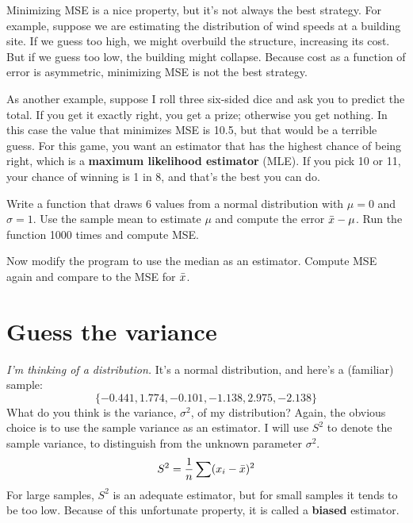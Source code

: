 \documentclass[12pt]{book}
\begin{document}
Minimizing MSE is a nice property, but it's not always the best
strategy.  For example, suppose we are estimating the distribution of
wind speeds at a building site.  If we guess too high, we might
overbuild the structure, increasing its cost.  But if we guess too
low, the building might collapse.  Because cost as a function of
error is asymmetric, minimizing MSE is not the best strategy.


As another example, suppose I roll three six-sided dice and ask you
to predict the total.  If you get it exactly right, you get a prize;
otherwise you get nothing.  In this case the value that minimizes MSE
is 10.5, but that would be a terrible guess.  For this game, you
want an estimator that has the highest chance of being right, which is
a {\bf maximum likelihood estimator} (MLE).  If you pick 10 or 11, your
chance of winning is 1 in 8, and that's the best you can do.


\begin{exercise}
Write a function that draws 6 values from a normal distribution with
$\mu=0$ and $\sigma=1$.  Use the sample mean to estimate $\mu$ and
compute the error $\bar{x} - \mu$.  Run the function 1000 times and
compute MSE.


Now modify the program to use the median as an
estimator.  Compute MSE again and compare to the MSE for $\bar{x}$.


\end{exercise}


\section{Guess the variance}


{\em I'm thinking of a distribution.}  It's a normal distribution, and 
here's a (familiar) sample:
%
\[ \{ -0.441, 1.774, -0.101, -1.138, 2.975, -2.138 \} \]
%
What do you think is the variance, $\sigma^2$, of my distribution?
Again, the obvious choice is to use the sample variance as an estimator.
I will use $S^2$ to denote the sample variance, to distinguish from the
unknown parameter $\sigma^2$.
%
\[ S^2 = \frac{1}{n} \sum (x_i - \bar{x})^2 \] 
%
For large samples, $S^2$ is an adequate estimator, but for small
samples it tends to be too low.  Because of this unfortunate
property, it is called a {\bf biased} estimator.
\end{document}
